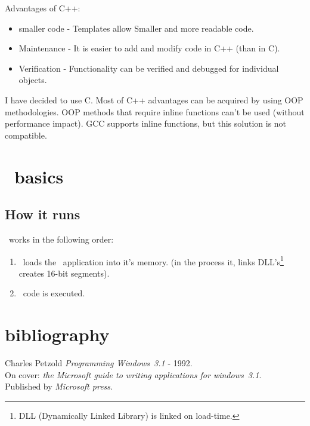 Advantages of C++:

\begin{itemize}
  \item smaller code - Templates allow Smaller and more readable code.
  \item Maintenance - It is easier to add and modify code in C++ (than in C).
  \item Verification - Functionality can be verified and debugged for
    individual objects.
\end{itemize}

I have decided to use C. Most of C++ advantages can be acquired
by using OOP methodologies. OOP methods that require inline functions
can't be used (without performance impact). GCC supports inline functions,
but this solution is not compatible.



\section{\Wine\ basics}
\subsection{How it runs}
\Wine\ works in the following order:
\begin{enumerate}
  \item \Wine\ loads the \windoz\  application into it's memory.
    (in the process it, links
    DLL's\footnote{DLL (Dynamically Linked Library) is linked on load-time.}
    creates 16-bit segments).
  \item \windoz\  code is executed.
\end{enumerate}

\section{bibliography}
\begin{thebibliography}{99}
   Charles Petzold {\em  Programming
      Windows~3.1}{} - 1992. \\ 
    On cover: {\em the Microsoft guide to writing applications for
      windows~3.1}. \\
    Published by {\em Microsoft press}. 
\end{thebibliography}


\newpage



